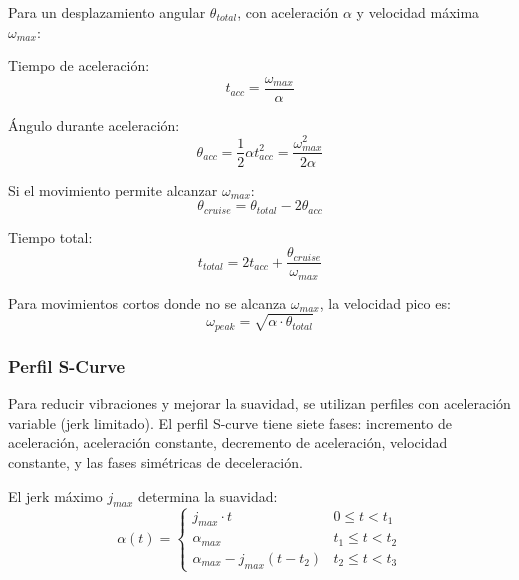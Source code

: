 Para un desplazamiento angular $\theta_{total}$, con aceleración $\alpha$ y velocidad máxima $\omega_{max}$:

Tiempo de aceleración:
\begin{equation}
t_{acc} = \frac{\omega_{max}}{\alpha}
\end{equation}

Ángulo durante aceleración:
\begin{equation}
\theta_{acc} = \frac{1}{2}\alpha t_{acc}^2 = \frac{\omega_{max}^2}{2\alpha}
\end{equation}

Si el movimiento permite alcanzar $\omega_{max}$:
\begin{equation}
\theta_{cruise} = \theta_{total} - 2\theta_{acc}
\end{equation}

Tiempo total:
\begin{equation}
t_{total} = 2t_{acc} + \frac{\theta_{cruise}}{\omega_{max}}
\end{equation}

Para movimientos cortos donde no se alcanza $\omega_{max}$, la velocidad pico es:
\begin{equation}
\omega_{peak} = \sqrt{\alpha \cdot \theta_{total}}
\end{equation}

\subsubsection{Perfil S-Curve}

Para reducir vibraciones y mejorar la suavidad, se utilizan perfiles con aceleración variable (jerk limitado). El perfil S-curve tiene siete fases: incremento de aceleración, aceleración constante, decremento de aceleración, velocidad constante, y las fases simétricas de deceleración.

El jerk máximo $j_{max}$ determina la suavidad:
\begin{equation}
\alpha(t) = \begin{cases}
j_{max} \cdot t & 0 \leq t < t_1 \\
\alpha_{max} & t_1 \leq t < t_2 \\
\alpha_{max} - j_{max}(t - t_2) & t_2 \leq t < t_3
\end{cases}
\end{equation}

